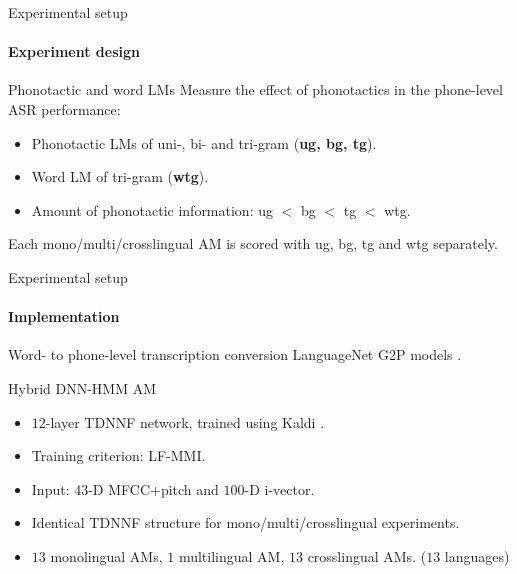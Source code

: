\documentclass{beamer}
\begin{document}
\begin{frame}{Experimental setup}
\framesubtitle{Experiment design}

\begin{block}{Phonotactic and word LMs}
Measure the effect of phonotactics in the phone-level ASR performance:
 \begin{itemize}
     \item Phonotactic LMs of uni-, bi- and tri-gram (\textbf{ug, bg, tg}).
     \item Word LM of tri-gram (\textbf{wtg}).
     \item Amount of phonotactic information: ug $<$ bg $<$ tg $<$ wtg.
 \end{itemize}
 Each mono/multi/crosslingual AM is scored with ug, bg, tg and wtg separately.
    
\end{block}
    
\end{frame}
\begin{frame}{Experimental setup}
\framesubtitle{Implementation}
\begin{block}{Word- to phone-level transcription conversion}
LanguageNet G2P models \cite{hasegawa2020grapheme}.
    
\end{block}
\begin{block}{Hybrid DNN-HMM AM}
\begin{itemize}
    \item $12$-layer TDNNF network, trained using Kaldi \cite{povey2011kaldi}.
    \item Training criterion: LF-MMI.
    \item Input: $43$-D MFCC+pitch  and $100$-D i-vector.
    \item Identical TDNNF structure for mono/multi/crosslingual experiments.
    \item $13$ monolingual AMs, $1$ multilingual AM, $13$ crosslingual AMs. ($13$ languages)
\end{itemize}

\end{block}    
\end{frame}
\end{document}
